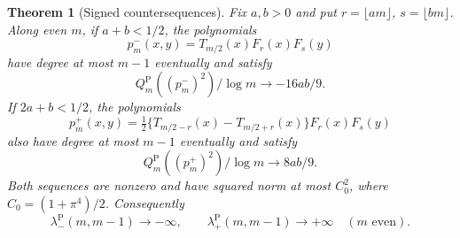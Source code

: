 \documentclass[preprint,12pt,a4paper]{elsarticle}
\newtheorem{theorem}{Theorem}[section]
\theoremstyle{remark}
\newcommand{\Pa}{\mathrm P}
\begin{document}
\begin{theorem}[Signed countersequences]\label{thm:padua-carriers}
Fix $a,b>0$ and put $r=\lfloor am\rfloor$, $s=\lfloor bm\rfloor$.
Along even $m$, if $a+b<1/2$, the polynomials
\[
 p_m^-(x,y)=T_{m/2}(x)F_r(x)F_s(y)
\]
have degree at most $m-1$ eventually and satisfy
\begin{equation}\label{eq:padua-negative}
 Q_m^\Pa((p_m^-)^2)/\log m\longrightarrow-16ab/9.
\end{equation}
If $2a+b<1/2$, the polynomials
\[
 p_m^+(x,y)=\tfrac12\{T_{m/2-r}(x)-T_{m/2+r}(x)\}F_r(x)F_s(y)
\]
also have degree at most $m-1$ eventually and satisfy
\begin{equation}\label{eq:padua-positive}
 Q_m^\Pa((p_m^+)^2)/\log m\longrightarrow8ab/9.
\end{equation}
Both sequences are nonzero and have squared norm at most $C_0^2$,
where $C_0=(1+\pi^4)/2$. Consequently
\[
 \lambda^\Pa_-(m,m-1)\longrightarrow-\infty,\qquad
 \lambda^\Pa_+(m,m-1)\longrightarrow+\infty
 \quad(m\text{ even}).
\]
\end{theorem}
\end{document}
